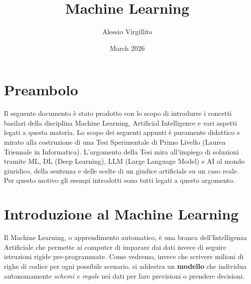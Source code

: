 \documentclass{article}
\title{Machine Learning}
\author{Alessio Virgillito}
\date{March 2026}
\begin{document}
\maketitle

\tableofcontents
\newpage

\section{Preambolo}
Il seguente documento è stato prodotto con lo scopo di introdurre i concetti basilari della disciplina Machine Learning, Artificial Intelligence e vari aspetti legati a questa materia. Lo scopo dei seguenti appunti è puramente didattico e mirato alla costruzione di una Tesi Sperimentale di Primo Livello (Laurea Triennale in Informatica). L'argomento della Tesi mira all'impiego di soluzioni tramite ML, DL (Deep Learning), LLM (Large Language Model) e AI al mondo giuridico, della sentenza e delle scelte di un giudice artificiale su un caso reale. Per questo motivo gli esempi introdotti sono tutti legati a questo argomento.

\section{Introduzione al Machine Learning}
Il Machine Learning, o apprendimento automatico, è una branca dell'Intelligenza Artificiale che permette ai computer di imparare dai dati invece di seguire istruzioni rigide pre-programmate. Come vedremo, invece che scrivere milioni di righe di codice per ogni possibile scenario, si addestra un \textbf{modello} che individua autonomamente \textit{schemi e regole} nei dati per fare previsioni o prendere decisioni.
\end{document}
